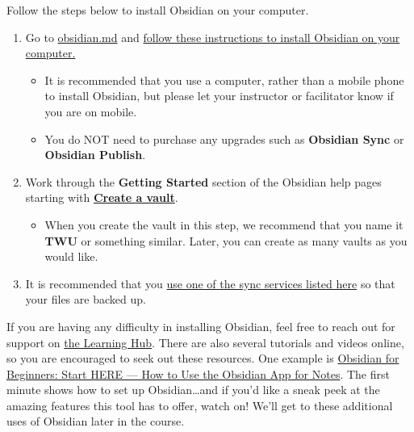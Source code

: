 \documentclass[
]{book}
\providecommand{\tightlist}{%
  \setlength{\itemsep}{0pt}\setlength{\parskip}{0pt}}
\theoremstyle{definition}
\theoremstyle{definition}
\theoremstyle{definition}
\theoremstyle{definition}
\theoremstyle{remark}
\begin{document}
\begin{reflect}
Follow the steps below to install Obsidian on your computer.

\begin{enumerate}
\def\labelenumi{\arabic{enumi}.}
\tightlist
\item
  Go to \href{https://obsidian.md/download}{obsidian.md} and \href{https://help.obsidian.md/Getting+started/Download+and+install+Obsidian}{follow these instructions to install Obsidian on your computer.}

  \begin{itemize}
  \tightlist
  \item
    It is recommended that you use a computer, rather than a mobile phone to install Obsidian, but please let your instructor or facilitator know if you are on mobile.
  \item
    You do NOT need to purchase any upgrades such as \textbf{Obsidian Sync} or \textbf{Obsidian Publish}.
  \end{itemize}
\item
  Work through the \textbf{Getting Started} section of the Obsidian help pages starting with \textbf{\href{https://help.obsidian.md/Getting+started/Create+a+vault}{Create a vault}}.

  \begin{itemize}
  \tightlist
  \item
    When you create the vault in this step, we recommend that you name it \textbf{TWU} or something similar. Later, you can create as many vaults as you would like.
  \end{itemize}
\item
  It is recommended that you \href{https://help.obsidian.md/Getting+started/Sync+your+notes+across+devices}{use one of the sync services listed here} so that your files are backed up.
\end{enumerate}

If you are having any difficulty in installing Obsidian, feel free to reach out for support on \href{https://twu.discourse.group/c/ldrs101/10}{the Learning Hub}. There are also several tutorials and videos online, so you are encouraged to seek out these resources. One example is \href{https://www.youtube.com/watch?v=QgbLb6QCK88}{Obsidian for Beginners: Start HERE --- How to Use the Obsidian App for Notes}. The first minute shows how to set up Obsidian\ldots and if you'd like a sneak peek at the amazing features this tool has to offer, watch on! We'll get to these additional uses of Obsidian later in the course.
\end{reflect}
\end{document}
